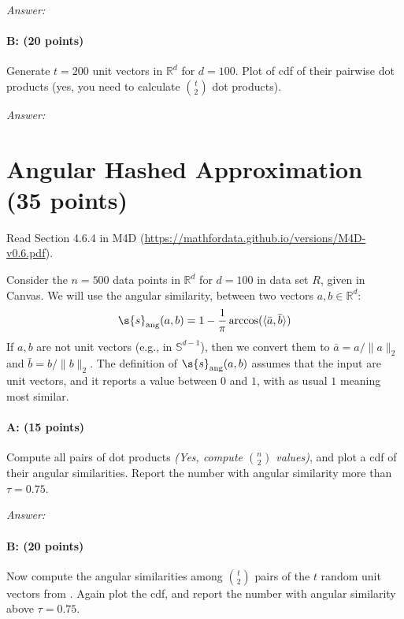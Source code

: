 \documentclass[11pt]{article}
\begin{document}
\emph{Answer:} 

\paragraph{B:  (20 points)}
Generate $t = 200$ unit vectors in $\mathbb{R}^d$ for $d=100$.    Plot of cdf of their pairwise dot products (yes, you need to calculate ${t \choose 2}$ dot products).  

\emph{Answer:} 




\section{Angular Hashed Approximation (35 points)}

Read Section 4.6.4 in M4D (\url{https://mathfordata.github.io/versions/M4D-v0.6.pdf}). 

Consider the $n = 500$ data points in $\mathbb{R}^d$ for $d=100$ in data set $R$, given in Canvas.  We will use the angular similarity, between two vectors $a,b \in \mathbb{R}^d$:
\[
\s{s}_\mathrm{ang}(a,b) = 1- \frac{1}{\pi} \arccos(\langle \bar a, \bar b \rangle) 
\]
If $a,b$ are not unit vectors (e.g., in $\mathbb{S}^{d-1}$), then we convert them to 
$\bar a = a/\|a\|_2$ and $\bar b = b/\|b\|_2$.  The definition of $\s{s}_\mathrm{ang}(a,b)$ assumes that the input are unit vectors, and it reports a value between $0$ and $1$, with as usual $1$ meaning most similar.  

\paragraph{A: (15 points)} 
Compute all pairs of dot products \emph{(Yes, compute ${n \choose 2}$ values)}, and plot a cdf  of their angular similarities.  
Report the number with angular similarity more than $\tau =0.75$.  

\emph{Answer:} 

\paragraph{B:  (20 points)}
Now compute the angular similarities among ${t \choose 2}$ pairs of the $t$ random unit vectors from .  Again plot the cdf, and report the number with angular similarity above $\tau = 0.75$.  
\end{document}
